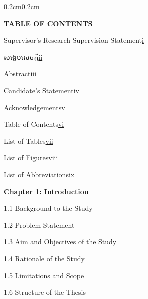 {\englishfont 
\begin{adjustwidth}{0.2cm}{0.2cm}
\englishfont\fontsize{13.5pt}{17pt}\selectfont 
    \begin{center}
        {\englishfont\fontsize{14pt}{21pt}\selectfont \textbf{TABLE OF CONTENTS} \par}
    \end{center}
    \label{toc}

    \vspace{0.1cm}
    \setlength{\parindent}{0pt}
    \vspace{0.3cm}
    
    { Supervisor's Research Supervision Statement\dotfill\hyperref[supervisor-statement]{i}\par}
    {\khmernormal\fontsize{11pt}{16pt}\selectfont សង្ខេបសេចក្ដី\dotfill\hyperref[khmer-abstract]{ii}\par}
    { Abstract\dotfill\hyperref[abstract]{iii}\par}
    { Candidate's Statement\dotfill\hyperref[candidate-statement]{iv}\par}
    { Acknowledgements\dotfill\hyperref[acknowledgements]{v}\par}
    { Table of Contents\dotfill\hyperref[toc]{vi}\par}
    { List of Tables\dotfill\hyperref[lot]{vii}\par}
    { List of Figures\dotfill\hyperref[lof]{viii}\par}
    { List of Abbreviations\dotfill\hyperref[loa]{ix}\par}

    \vspace{0.5cm}
    { \textbf{Chapter 1: Introduction}\dotfill\pageref{ch:intro}\par}
    { \hspace{0.5cm} 1.1 Background to the Study\dotfill\pageref{sec:background}\par}
    { \hspace{0.5cm} 1.2 Problem Statement\dotfill\pageref{sec:problem}\par}
    { \hspace{0.5cm} 1.3 Aim and Objectives of the Study\dotfill\pageref{sec:objectives}\par}
    { \hspace{0.5cm} 1.4 Rationale of the Study\dotfill\pageref{sec:rationale}\par}
    { \hspace{0.5cm} 1.5 Limitations and Scope\dotfill\pageref{sec:limitations}\par}
    { \hspace{0.5cm} 1.6 Structure of the Thesis\dotfill\pageref{sec:structure}\par}


\end{adjustwidth}}
